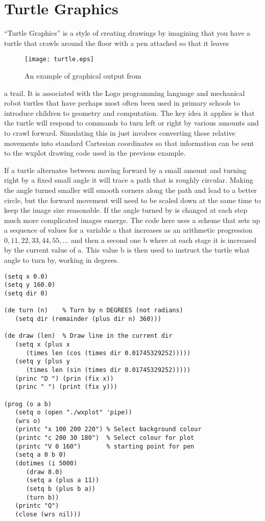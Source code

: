 \section{Turtle Graphics}
``Turtle Graphics'' is a style of creating drawings by imagining that
you have a turtle that crawls around the floor with a pen attached so that
it leaves
\begin{wrapfigure}{r}{2.5in}
{\centering
\texttt{[image: turtle.eps]}}
\caption{An example of graphical output from \vsl}
\end{wrapfigure} a trail. It is associated with the Logo programming language
and mechanical robot turtles that have perhaps most often been used
in primary schools to introduce children to geometry and computation. The
key idea it applies is that the turtle will respond to commands to
turn left or right by various amounts and to crawl forward. Simulating this
in \vsl{} just involves converting these relative movements into standard
Cartesian coordinates so that information can be sent to the {\tx wxplot}
drawing code used in the previous example.

If a turtle alternates between moving forward by a small amount and
turning right by a fixed small angle it will trace a path that is
roughly circular. Making the angle turned smaller will smooth corners
along the path and lead to a better circle, but the forward movement will need
to be scaled down at the same time to keep the image size reasonable.
If the angle turned by is changed at each step much more complicated
images emerge. The code here uses a scheme that sets up a sequence of
values for a variable {\tx a} that increases as an arithmetic progression
$0, 11, 22, 33, 44, 55,\ldots$ and then a second one {\tx b} where at
each stage it is increased by the current value of {\tx a}. This value
{\tx b} is then used to instruct the turtle what angle to turn by, working
in degrees. 
{\small\begin{verbatim}
(setq x 0.0)
(setq y 160.0)
(setq dir 0)

(de turn (n)    % Turn by n DEGREES (not radians)
   (setq dir (remainder (plus dir n) 360)))

(de draw (len)  % Draw line in the current dir
   (setq x (plus x
      (times len (cos (times dir 0.01745329252)))))
   (setq y (plus y
      (times len (sin (times dir 0.01745329252)))))
   (princ "D ") (prin (fix x))
   (princ " ") (print (fix y)))

(prog (o a b)
   (setq o (open "./wxplot" 'pipe))
   (wrs o)
   (printc "x 100 200 220") % Select background colour
   (printc "c 200 30 180")  % Select colour for plot
   (printc "V 0 160")       % starting point for pen
   (setq a 0 b 0)
   (dotimes (i 5000)
      (draw 8.0)
      (setq a (plus a 11))
      (setq b (plus b a))
      (turn b))
   (printc "Q")
   (close (wrs nil)))
\end{verbatim}}


